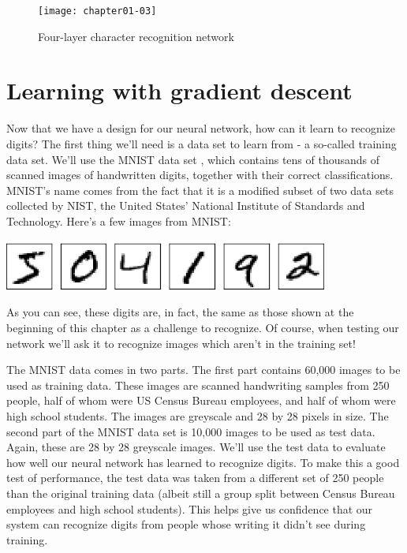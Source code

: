 \begin{figure}[tbhp]
\centering
\texttt{[image: chapter01-03]}
\caption{Four-layer character recognition network}
\label{fig:chapter01-03}
\end{figure}


\section{Learning with gradient descent}

Now that we have a design for our neural network, how can it learn to recognize digits? The first thing we'll need is a data set to learn from - a so-called training data set. We'll use the MNIST data set \cite{LeCun2019}, which contains tens of thousands of scanned images of handwritten digits, together with their correct classifications. MNIST's name comes from the fact that it is a modified subset of two data sets collected by NIST, the United States' National Institute of Standards and Technology. Here's a few images from MNIST:

{\centering
\includegraphics[width=0.8\textwidth,]{pic/digits_separate}
\par}

As you can see, these digits are, in fact, the same as those shown at the beginning of this chapter as a challenge to recognize. Of course, when testing our network we'll ask it to recognize images which aren't in the training set!

The MNIST data comes in two parts. The first part contains 60,000 images to be used as training data. These images are scanned handwriting samples from 250 people, half of whom were US Census Bureau employees, and half of whom were high school students. The images are greyscale and 28 by 28 pixels in size. The second part of the MNIST data set is 10,000 images to be used as test data. Again, these are 28 by 28 greyscale images. We'll use the test data to evaluate how well our neural network has learned to recognize digits. To make this a good test of performance, the test data was taken from a different set of 250 people than the original training data (albeit still a group split between Census Bureau employees and high school students). This helps give us confidence that our system can recognize digits from people whose writing it didn't see during training.

